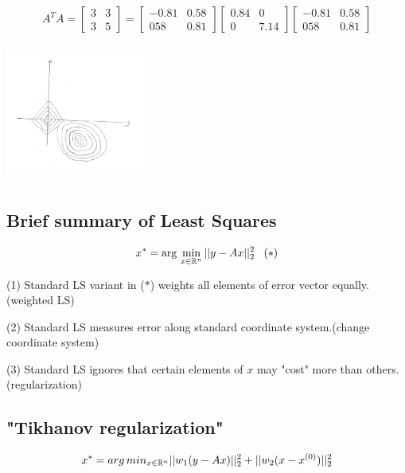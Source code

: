 $$A^TA=
\begin{bmatrix}
3&3\\
3&5
\end{bmatrix}
=
\begin{bmatrix}
-0.81&0.58\\
058&0.81
\end{bmatrix}
\begin{bmatrix}
0.84&0\\
0&7.14
\end{bmatrix}
\begin{bmatrix}
-0.81&0.58\\
058&0.81
\end{bmatrix}
$$
\begin{marginfigure}
	\centering
	\includegraphics[width=1.8in,height=1.8in]{figures/ch06/ch06-08.jpg}
\end{marginfigure}


\subsection{Brief summary of Least Squares}
\begin{equation*}
x^* = \arg\, \min_{x\in \mathbb{R}^n}||y-Ax||_2^2 \,\,\,\,\, (*)
\end{equation*}

	(1) Standard LS variant in ($*$) weights all elements of error vector equally.(weighted LS)
	
	(2) Standard LS measures error along standard coordinate system.(change coordinate system)
	
	(3) Standard LS ignores that certain elements of $x$ may "cost" more than others.(regularization)

\subsection{"Tikhanov regularization"}
$$x^* =arg\,min_{x\in \mathbb{R}^n}||w_1(y-Ax)||_2^2 + ||w_2(x - x^{(0)})||_2^2$$

